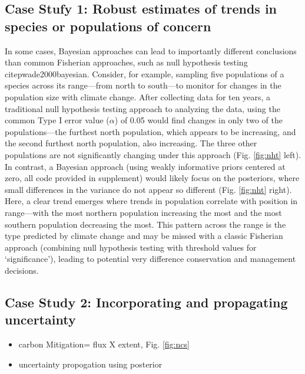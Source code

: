 \documentclass{article}
\begin{document}
\subsection*{Case Stufy 1: Robust estimates of trends in species or populations of concern}
\par In some cases, Bayesian approaches can lead to importantly different conclusions than common Fisherian approaches, such as null hypothesis testing citep{wade2000bayesian}. Consider, for example, sampling five populations of a species across its range---from north to south---to monitor for changes in the population size with climate change. After collecting data for ten years, a traditional null hypothesis testing approach to analyzing the data, using the common Type I error value ($\alpha$) of 0.05 would find changes in only two of the populations---the furthest north population, which appears to be increasing, and the second furthest north population, also increasing. The three other populations are not significantly changing under this approach (Fig. \ref{fig:nht} left). In contrast, a Bayesian approach (using weakly informative priors centered at zero, all code provided in supplement) would likely focus on the posteriors, where small differences in the variance do not appear so different  (Fig. \ref{fig:nht} right). Here, a clear trend emerges where trends in population correlate with position in range---with the most northern population increasing the most and the most southern population decreasing the most. This pattern across the range is the type predicted by climate change and may be missed with a classic Fisherian approach (combining null hypothesis testing with threshold values for `significance'), leading to potential very difference conservation and management decisions. %


\subsection*{Case Study 2: Incorporating and propagating uncertainty}
\begin{itemize}
\item carbon Mitigation= flux X extent, Fig. \ref{fig:ncs}
\item uncertainty propogation using posterior
\end{itemize}
\end{document}
